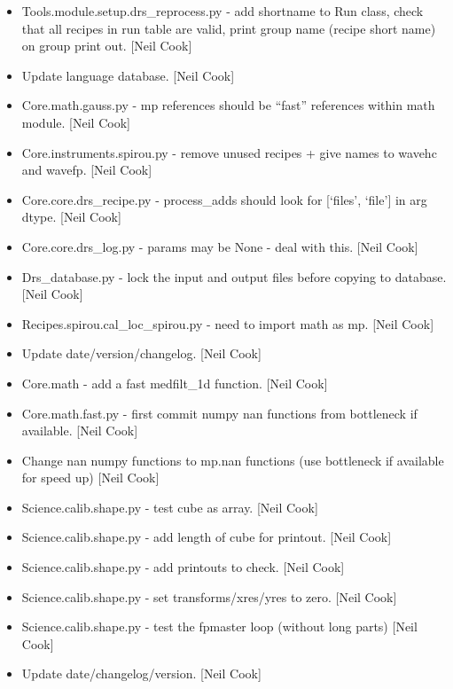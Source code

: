 \documentclass[a4paper,10pt,english]{report}
\begin{document}
\label{\detokenize{misc/changelog:id68}}\begin{itemize}
\item {} 
Tools.module.setup.drs\_reprocess.py - add shortname to Run class,
check that all recipes in run table are valid, print group name
(recipe short name) on group print out. {[}Neil Cook{]}

\item {} 
Update language database. {[}Neil Cook{]}

\item {} 
Core.math.gauss.py - mp references should be “fast” references within
math module. {[}Neil Cook{]}

\item {} 
Core.instruments.spirou.py - remove unused recipes + give names to
wavehc and wavefp. {[}Neil Cook{]}

\item {} 
Core.core.drs\_recipe.py - process\_adds should look for {[}‘files’,
‘file’{]} in arg dtype. {[}Neil Cook{]}

\item {} 
Core.core.drs\_log.py - params may be None - deal with this. {[}Neil
Cook{]}

\item {} 
Drs\_database.py - lock the input and output files before copying to
database. {[}Neil Cook{]}

\item {} 
Recipes.spirou.cal\_loc\_spirou.py - need to import math as mp. {[}Neil
Cook{]}

\item {} 
Update date/version/changelog. {[}Neil Cook{]}

\item {} 
Core.math - add a fast medfilt\_1d function. {[}Neil Cook{]}

\item {} 
Core.math.fast.py - first commit numpy nan functions from bottleneck
if available. {[}Neil Cook{]}

\item {} 
Change nan numpy functions to mp.nan functions (use bottleneck if
available for speed up) {[}Neil Cook{]}

\item {} 
Science.calib.shape.py - test cube as array. {[}Neil Cook{]}

\item {} 
Science.calib.shape.py - add length of cube for printout. {[}Neil Cook{]}

\item {} 
Science.calib.shape.py - add printouts to check. {[}Neil Cook{]}

\item {} 
Science.calib.shape.py - set transforms/xres/yres to zero. {[}Neil Cook{]}

\item {} 
Science.calib.shape.py - test the fpmaster loop (without long parts)
{[}Neil Cook{]}

\item {} 
Update date/changelog/version. {[}Neil Cook{]}

\end{itemize}
\end{document}
